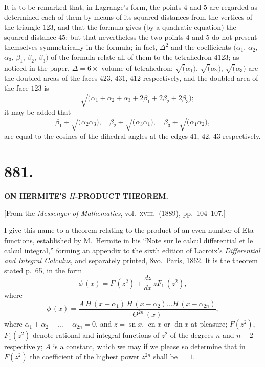 \documentclass[11pt,a4paper]{article}
\theoremstyle{plain}
\theoremstyle{definition}
\begin{document}
It is to be remarked that, in Lagrange's form, the points $4$ and $5$ are regarded as determined each of them by means of its squared distances from the vertices of the triangle $123$, and that the formula gives (by a quadratic equation) the squared distance $45$; but that nevertheless the two points $4$ and $5$ do not present themselves symmetrically in the formula; in fact, $\Delta^2$ and the coefficients $(\alpha_1$, $\alpha_2$, $\alpha_3$, $\beta_1$, $\beta_2$, $\beta_3)$ of the formula relate all of them to the tetrahedron $4123$; as noticed in the paper, $\Delta = 6 \times$ volume of tetrahedron; $\surd(\alpha_1)$, $\surd(\alpha_2)$, $\surd(\alpha_3)$ are the doubled areas of the faces $423$, $431$, $412$ respectively, and the doubled area of the face $123$ is
\[ = \surd(\alpha_1 + \alpha_2 + \alpha_3 + 2\beta_1 + 2\beta_2 + 2\beta_3); \]
it may be added that
\[ \beta_1 \div \surd(\alpha_2 \alpha_3),\quad \beta_2 \div \surd(\alpha_3 \alpha_1),\quad \beta_3 \div \surd(\alpha_1 \alpha_2), \]
are equal to the cosines of the dihedral angles at the edges $41$, $42$, $43$ respectively.


\newpage
\section*{881.}

\begin{center}
\textbf{ON HERMITE'S $H$-PRODUCT THEOREM.}
\end{center}

\begin{center}
[From the \textit{Messenger of Mathematics}, vol.\ \textsc{xviii}.\ (1889), pp.\ 104--107.]
\end{center}

I give this name to a theorem relating to the product of an even number of Eta-functions, established by M.~Hermite in his ``Note sur le calcul differential et le calcul integral,'' forming an appendix to the sixth edition of Lacroix's \textit{Differential and Integral Calculus}, and separately printed, 8vo.\ Paris, 1862. It is the theorem stated p.~65, in the form
\[ \phi\,(x) = F\,(z^2) + \frac{dz}{dx}\, z F_1\,(z^2), \]
where
\[ \phi\,(x) = \frac{A\,H\,(x-\alpha_1)\, H\,(x-\alpha_2) \ldots H\,(x-\alpha_{2n})}{\Theta^{2n}\,(x)}, \]
where $\alpha_1 + \alpha_2 + \ldots + \alpha_{2n} = 0$, and $z = \operatorname{sn} x$, $\operatorname{cn} x$ or $\operatorname{dn} x$ at pleasure; $F(z^2)$, $F_1(z^2)$ denote rational and integral functions of $z^2$ of the degrees $n$ and $n-2$ respectively; $A$ is a constant, which we may if we please so determine that in $F(z^2)$ the coefficient of the highest power $z^{2n}$ shall be $=1$.
\end{document}
